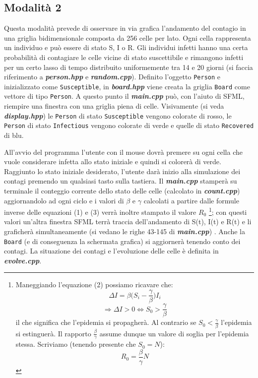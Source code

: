 \documentclass[a4paper,10 pt]{article}
\begin{document}
\subsection{Modalità 2}
Questa modalità prevede di osservare in via grafica l'andamento del contagio in una griglia bidimensionale composta da 256 celle per lato. Ogni cella rappresenta un individuo e può essere di stato S, I o R. Gli individui infetti hanno una certa probabilità di contagiare le celle vicine di stato suscettibile e rimangono infetti per un certo lasso di tempo distribuito uniformemente tra 14 e 20 giorni (si faccia riferimento a \textbf{\textit{person.hpp}} e \textbf{\textit{random.cpp}}). Definito l'oggetto \verb!Person! e inizializzato come \verb!Susceptible!, in \textbf{\textit{board.hpp}} viene creata la griglia \verb!Board! come vettore di tipo  \verb!Person!. A questo punto il \textbf{\textit{main.cpp}} può, con l'aiuto di SFML, riempire una finestra con una griglia piena di celle. Visivamente (si veda  \textbf{\textit{display.hpp}}) le \verb!Person! di stato \verb!Susceptible! vengono colorate di rosso, le \verb!Person! di stato \verb!Infectious! vengono colorate di verde e quelle di stato \verb!Recovered! di blu.

All'avvio del programma l'utente con il mouse dovrà premere su ogni cella che vuole considerare infetta allo stato iniziale e quindi si colorerà di verde. Raggiunto lo stato iniziale desiderato, l'utente darà inizio alla simulazione dei contagi premendo un qualsiasi tasto sulla tastiera. Il \textbf{\textit{main.cpp}} stamperà su terminale il conteggio corrente dello stato delle celle (calcolato in \textbf{\textit{count.cpp}}) aggiornandolo ad ogni ciclo e i valori di $\beta$ e $\gamma$ calcolati a partire dalle formule inverse delle equazioni (1) e (3) verrà inoltre stampato il valore $R_0$ 
\footnote{
  Maneggiando l'equazione (2) possiamo ricavare che:
  $$
    \Delta I = \beta \big( S_i - \frac{\gamma}{\beta} \big) I_i
  $$
  $$
    \Rightarrow \Delta I > 0 \Leftrightarrow S_0 > \frac{\gamma}{\beta}
  $$ il che significa che l'epidemia si propagherà. Al contrario se $S_0 < \frac{\gamma}{\beta}$
  l'epidemia si estinguerà. Il rapporto $\frac{\beta}{\gamma}$ assume dunque un valore di soglia per l'epidemia
  stessa. Scriviamo (tenendo presente che $S_0 = N$):
  $$
    R_0 = \frac{\beta}{\gamma} N 
  $$
}; con questi valori un'altra finestra SFML terrà traccia dell'andamento di S(t), I(t) e R(t) e li graficherà simultaneamente (si vedano le righe 43-145 di \textbf{\textit{main.cpp}}) . Anche la \verb!Board! (e di conseguenza la schermata grafica) si aggiornerà tenendo conto dei contagi. La situazione dei contagi e l'evoluzione delle celle è definita in \textbf{\textit{evolve.cpp}}.
\end{document}
